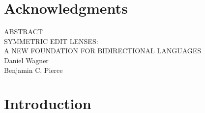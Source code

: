 \documentclass[12pt]{report}
\numberwithin{equation}{section}
\def\thetitle{\uppercase{Symmetric Edit Lenses:\\A New Foundation For Bidirectional Languages}}
\def\theauthor{Daniel Wagner}
\def\theadvisor{Benjamin C. Pierce}
\begin{document}
\chapter*{Acknowledgments}

\newpage
\vspace*{\fill}

\begin{center}
  ABSTRACT\\
\vspace{.5in}
\thetitle\\
\vspace{.5in}
  \theauthor\\
  \theadvisor
\end{center}

\doublespacing
\noindent


\vspace*{\fill}

\newpage

\tableofcontents

\newpage

\listoftables

\listoffigures

\newpage
\singlespacing
{}

\chapter{Introduction}
\label{chap:introduction}
\label{chap:intro}
\end{document}
